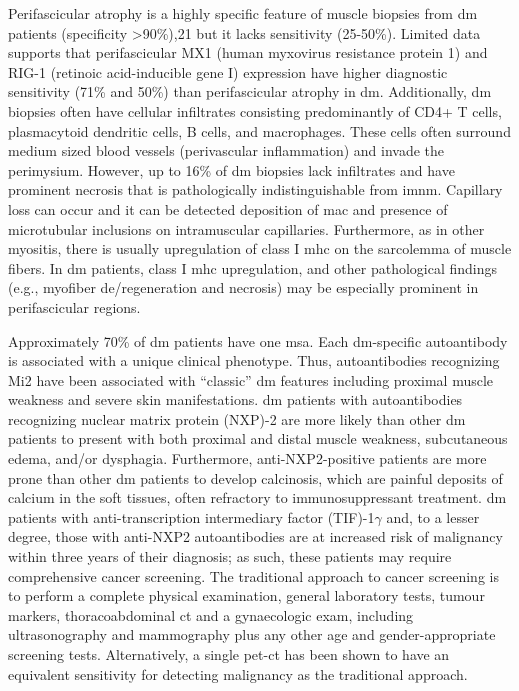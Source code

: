 Perifascicular atrophy is a highly specific feature of muscle biopsies from \gls{dm} patients (specificity >90\%),21 but it lacks sensitivity (25-50\%).\cite{SuarezCalvet2017,PinalFernandez2015} Limited data supports that perifascicular MX1 (human myxovirus resistance protein 1) and RIG-1 (retinoic acid-inducible gene I) expression have higher diagnostic sensitivity (71\% and 50\%) than perifascicular atrophy in \gls{dm}.\cite{SuarezCalvet2017,Uruha2017} Additionally, \gls{dm} biopsies often have cellular infiltrates consisting predominantly of CD4+ T cells, plasmacytoid dendritic cells, B cells, and macrophages.\cite{Dalakas2002} These cells often surround medium sized blood vessels (perivascular inflammation) and invade the perimysium.\cite{Dalakas2002} However, up to 16\% of \gls{dm} biopsies lack infiltrates and have prominent necrosis that is pathologically indistinguishable from \gls{imnm}.\cite{PinalFernandez2015} Capillary loss can occur and it can be detected deposition of \gls{mac} and presence of microtubular inclusions on intramuscular capillaries.\cite{Dalakas2002} Furthermore, as in other myositis, there is usually upregulation of class I \gls{mhc} on the sarcolemma of muscle fibers. In \gls{dm} patients, class I \gls{mhc} upregulation, and other pathological findings (e.g., myofiber de/regeneration and necrosis) may be especially prominent in perifascicular regions.\cite{Dalakas2002}

Approximately 70\% of \gls{dm} patients have one \gls{msa}.\cite{Betteridge2016} Each \gls{dm}-specific autoantibody is associated with a unique clinical phenotype. Thus, autoantibodies recognizing Mi2 have been associated with “classic” \gls{dm} features including proximal muscle weakness and severe skin manifestations.\cite{Ghirardello2005} \gls{dm} patients with autoantibodies recognizing nuclear matrix protein (NXP)-2 are more likely than other \gls{dm} patients to present with both proximal and distal muscle weakness, subcutaneous edema, and/or dysphagia.\cite{Albayda2017} Furthermore, anti-NXP2-positive patients are more prone than other \gls{dm} patients to develop calcinosis, which are painful deposits of calcium in the soft tissues, often refractory to immunosuppressant treatment.\cite{Albayda2017} \gls{dm} patients with anti-transcription intermediary factor (TIF)-1$\gamma$ and, to a lesser degree, those with anti-NXP2 autoantibodies are at increased risk of malignancy within three years of their diagnosis; as such, these patients may require comprehensive cancer screening.\cite{Albayda2017,Fiorentino2013,TralleroAraguas2012} The traditional approach to cancer screening is to perform a complete physical examination, general laboratory tests, tumour markers, thoracoabdominal \gls{ct} and a gynaecologic exam, including ultrasonography and mammography plus any other age and gender-appropriate screening tests. Alternatively, a single \gls{pet}-\gls{ct} has been shown to have an equivalent sensitivity for detecting malignancy as the traditional approach.\cite{SelvaOCallaghan2010}


